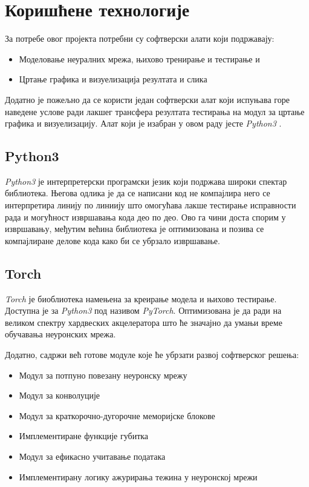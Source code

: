 \documentclass[a4paper, 12pt, master, utf8]{etf}
\begin{document}
\chapter{Коришћене технологије}
\label{sec:3}
За потребе овог пројекта потребни су софтверски алати који подржавају:

\begin{itemize}[noitemsep]
    \item Моделовање неуралних мрежа, њихово тренирање и тестирање и
    \item Цртање графика и визуелизација резултата и слика
\end{itemize}

Додатно је пожељно да се користи један софтверски алат који испуњава горе наведене услове ради лакшег трансфера резултата тестирања на модул за цртање графика
и визуелизацију. Алат који је изабран у овом раду јесте \textit{Python3} \cite{van1995python}.

\section{Python3}
\label{sec:31}
\textit{Python3} је интерпретерски програмски језик
који подржава широки спектар библиотека. Његова одлика је да се написани код не компајлира него се интерпретира линију по линиију што омогућава лакше тестирање исправности рада и могућност извршавања 
кода део по део. Ово га чини доста спорим у извршавању, међутим већина библиотека је оптимизована и позива се компајлиране делове кода како би се убрзало извршавање. 

\section{Torch}
\label{sec:32}
\textit{Torch} \cite{torch} је биоблиотека намењена за креирање модела и њихово тестирање. Доступна је за \textit{Python3} под називом \textit{PyTorch}.
Оптимизована је да ради на великом спектру хардвеских акцелератора што ће значајно да умањи време обучавања неуронских мрежа.
\newline

Додатно, садржи већ готове модуле које ће убрзати развој софтверског решења:

\begin{itemize}[noitemsep]
    \item Модул за потпуно повезану неуронску мрежу
    \item Модул за конволуције
    \item Модул за краткорочно-дугорочне меморијске блокове
    \item Имплементиране функције губитка
    \item Модул за ефикасно учитавање података
    \item Имплементирану логику ажурирања тежина у неуронској мрежи
\end{itemize}
\end{document}
